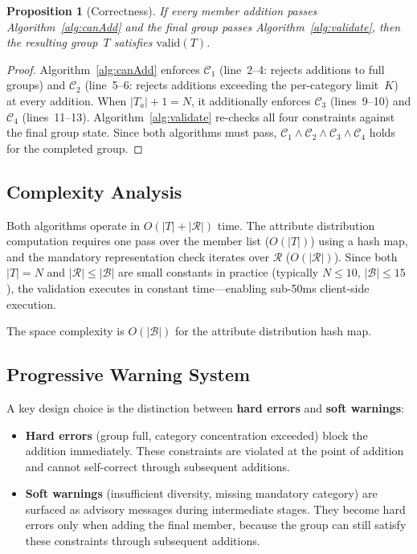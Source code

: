 \documentclass[11pt,a4paper]{article}
\theoremstyle{plain}
\newtheorem{proposition}[theorem]{Proposition}
\theoremstyle{definition}
\begin{document}
\begin{proposition}[Correctness]
\label{prop:correctness}
If every member addition passes Algorithm~\ref{alg:canAdd} and the final group passes Algorithm~\ref{alg:validate}, then the resulting group~$T$ satisfies $\text{valid}(T)$.
\end{proposition}

\begin{proof}
Algorithm~\ref{alg:canAdd} enforces $\mathcal{C}_1$ (line~2--4: rejects additions to full groups) and $\mathcal{C}_2$ (line~5--6: rejects additions exceeding the per-category limit~$K$) at every addition. When $|T_a| + 1 = N$, it additionally enforces $\mathcal{C}_3$ (lines~9--10) and $\mathcal{C}_4$ (lines~11--13). Algorithm~\ref{alg:validate} re-checks all four constraints against the final group state. Since both algorithms must pass, $\mathcal{C}_1 \wedge \mathcal{C}_2 \wedge \mathcal{C}_3 \wedge \mathcal{C}_4$ holds for the completed group.
\end{proof}

\subsection{Complexity Analysis}

Both algorithms operate in $O(|T| + |\mathcal{R}|)$ time. The attribute distribution computation requires one pass over the member list ($O(|T|)$) using a hash map, and the mandatory representation check iterates over $\mathcal{R}$ ($O(|\mathcal{R}|)$). Since both $|T| = N$ and $|\mathcal{R}| \leq |\mathcal{B}|$ are small constants in practice (typically $N \leq 10$, $|\mathcal{B}| \leq 15$), the validation executes in constant time---enabling sub-50ms client-side execution.

The space complexity is $O(|\mathcal{B}|)$ for the attribute distribution hash map.

\subsection{Progressive Warning System}

A key design choice is the distinction between \textbf{hard errors} and \textbf{soft warnings}:
\begin{itemize}[noitemsep,topsep=4pt]
    \item \textbf{Hard errors} (group full, category concentration exceeded) block the addition immediately. These constraints are violated at the point of addition and cannot self-correct through subsequent additions.
    \item \textbf{Soft warnings} (insufficient diversity, missing mandatory category) are surfaced as advisory messages during intermediate stages. They become hard errors only when adding the final member, because the group can still satisfy these constraints through subsequent additions.
\end{itemize}
\end{document}
